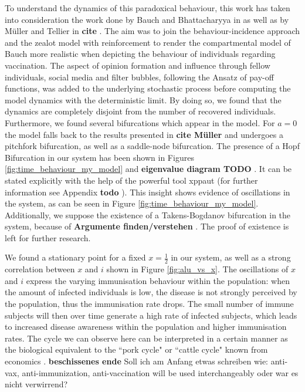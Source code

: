 \documentclass[12pt,a4paper,twoside]{article}
\begin{document}
To understand the dynamics of this paradoxical behaviour, this work has taken into consideration the work done by Bauch and Bhattacharyya in \cite{Bauch2012} as well as by M\"uller and Tellier in \textbf{cite}%
. The aim was to join the behaviour-incidence approach and the zealot model with reinforcement to render the compartmental model of Bauch more realistic when depicting the behaviour of individuals regarding vaccination. The aspect of opinion formation and influence through fellow individuals, social media and filter bubbles, following the Ansatz of pay-off functions, was added to the underlying stochastic process before computing the model dynamics with the deterministic limit. By doing so, we found that the dynamics are completely disjoint from the number of recovered individuals. Furthermore, we found several bifurcations which appear in the model. For $a=0$ the model falls back to the results presented in \textbf{cite Müller}%
and undergoes a pitchfork bifurcation, as well as a saddle-node bifurcation. The presence of a Hopf Bifurcation in our system has been shown in Figures \ref{fig:time_behaviour_my_model} and \textbf{eigenvalue diagram TODO}%
 . It can be stated explicitly with the help of the powerful tool xppaut (for further information see Appendix \textbf{todo}%
 ). This insight shows evidence of oscillations in the system, as can be seen in Figure \eqref{fig:time_behaviour_my_model}. Additionally, we suppose the existence of a Takens-Bogdanov bifurcation in the system, because of \textbf{Argumente finden/verstehen}%
 . The proof of existence is left for further research. \newline
 
 We found a stationary point for a fixed $x = \frac{1}{2}$ in our system, as well as a strong correlation between $x$ and $i$ shown in Figure \ref{fig:alu_vs_x}. The oscillations of $x$ and $i$ express the varying immunisation behaviour within the population: when the amount of infected individuals is low, the disease is not strongly perceived by the population, thus the immunisation rate drops. The small number of immune subjects will then over time generate a high rate of infected subjects, which leads to increased disease awareness within the population and higher immunisation rates. The cycle we can observe here can be interpreted in a certain manner as the biological equivalent to the ``pork cycle" or ``cattle cycle" known from economics \cite{Rosen1994}. \textbf{beschissenes ende}\newline\newline
 Soll ich am Anfang etwas schreiben wie: anti-vax, anti-immunization, anti-vaccination will be used interchangeably oder war es nicht verwirrend?

\newpage

\printbibliography

%
\end{document}
